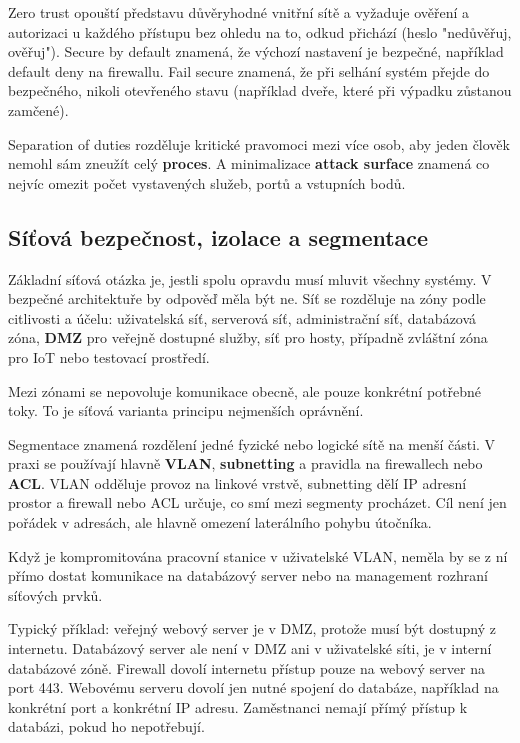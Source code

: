 \documentclass[11pt,a4paper]{article}
\begin{document}
Zero trust opouští představu důvěryhodné vnitřní sítě a vyžaduje ověření a autorizaci u každého přístupu bez ohledu na to, odkud přichází (heslo "nedůvěřuj, ověřuj"). Secure by default znamená, že výchozí nastavení je bezpečné, například default deny na firewallu. Fail secure znamená, že při selhání systém přejde do bezpečného, nikoli otevřeného stavu (například dveře, které při výpadku zůstanou zamčené).

Separation of duties rozděluje kritické pravomoci mezi více osob, aby jeden člověk nemohl sám zneužít celý \textbf{proces}. A minimalizace \textbf{attack surface} znamená co nejvíc omezit počet vystavených služeb, portů a vstupních bodů.

\subsection*{Síťová bezpečnost, izolace a segmentace}

Základní síťová otázka je, jestli spolu opravdu musí mluvit všechny systémy. V bezpečné architektuře by odpověď měla být ne. Síť se rozděluje na zóny podle citlivosti a účelu: uživatelská síť, serverová síť, administrační síť, databázová zóna, \textbf{DMZ} pro veřejně dostupné služby, síť pro hosty, případně zvláštní zóna pro IoT nebo testovací prostředí.

Mezi zónami se nepovoluje komunikace obecně, ale pouze konkrétní potřebné toky. To je síťová varianta principu nejmenších oprávnění.

Segmentace znamená rozdělení jedné fyzické nebo logické sítě na menší části. V praxi se používají hlavně \textbf{VLAN}, \textbf{subnetting} a pravidla na firewallech nebo \textbf{ACL}. VLAN odděluje provoz na linkové vrstvě, subnetting dělí IP adresní prostor a firewall nebo ACL určuje, co smí mezi segmenty procházet. Cíl není jen pořádek v adresách, ale hlavně omezení laterálního pohybu útočníka.

Když je kompromitována pracovní stanice v uživatelské VLAN, neměla by se z ní přímo dostat komunikace na databázový server nebo na management rozhraní síťových prvků.

Typický příklad: veřejný webový server je v DMZ, protože musí být dostupný z internetu. Databázový server ale není v DMZ ani v uživatelské síti, je v interní databázové zóně. Firewall dovolí internetu přístup pouze na webový server na port 443. Webovému serveru dovolí jen nutné spojení do databáze, například na konkrétní port a konkrétní IP adresu. Zaměstnanci nemají přímý přístup k databázi, pokud ho nepotřebují.
\end{document}
